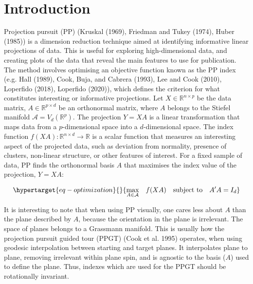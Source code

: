 \documentclass[
  12pt,
]{interact}
\theoremstyle{plain}
\begin{document}
\hypertarget{introduction}{%
\section{Introduction}\label{introduction}}

Projection pursuit (PP) (Kruskal (1969), Friedman and Tukey (1974),
Huber (1985)) is a dimension reduction technique aimed at identifying
informative linear projections of data. This is useful for exploring
high-dimensional data, and creating plots of the data that reveal the
main features to use for publication. The method involves optimising an
objective function known as the PP index (e.g. Hall (1989), Cook, Buja,
and Cabrera (1993), Lee and Cook (2010), Loperfido (2018), Loperfido
(2020)), which defines the criterion for what constitutes interesting or
informative projections. Let \(X \in \mathbb{R}^{n\times p}\) be the
data matrix, \(A \in\mathbb{R}^{p \times d}\) be an orthonormal matrix,
where \(A\) belongs to the Stiefel manifold
\(\mathcal{A} = V_d(\mathbb{R}^p)\). The projection \(Y = XA\) is a
linear transformation that maps data from a \(p\)-dimensional space into
a \(d\)-dimensional space. The index function
\(f(XA): \mathbb{R}^{n \times d} \to \mathbb{R}\) is a scalar function
that measures an interesting aspect of the projected data, such as
deviation from normality, presence of clusters, non-linear structure, or
other features of interest. For a fixed sample of data, PP finds the
orthonormal basis \(A\) that maximises the index value of the
projection, \(Y = XA\):

\begin{equation}\protect\hypertarget{eq-optimization}{}{
\underset{A \in \mathcal{A}}{\max } \quad f(XA) \quad \text{subject to} \quad A'A = I_d
}\label{eq-optimization}\end{equation}

It is interesting to note that when using PP visually, one cares less
about \(A\) than the plane described by \(A\), because the orientation
in the plane is irrelevant. The space of planes belongs to a Grassmann
manifold. This is usually how the projection pursuit guided tour (PPGT)
(Cook et al. 1995) operates, when using geodesic interpolation between
starting and target planes. It interpolates plane to plane, removing
irrelevant within plane spin, and is agnostic to the basis (\(A\)) used
to define the plane. Thus, indexes which are used for the PPGT should be
rotationally invariant.
\end{document}
